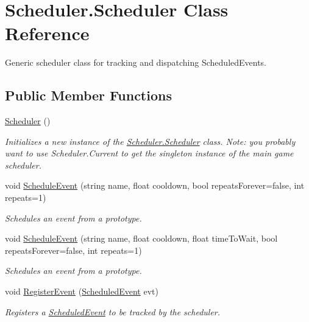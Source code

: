 \hypertarget{class_scheduler_1_1_scheduler}{}\section{Scheduler.\+Scheduler Class Reference}
\label{class_scheduler_1_1_scheduler}


Generic scheduler class for tracking and dispatching Scheduled\+Events.  


\subsection*{Public Member Functions}
\begin{DoxyCompactItemize}
\item 
\hyperlink{class_scheduler_1_1_scheduler_a0e6742111304fdc40c80b819da24d3f7}{Scheduler} ()
\begin{DoxyCompactList}\small\item\em Initializes a new instance of the \hyperlink{class_scheduler_1_1_scheduler}{Scheduler.\+Scheduler} class. Note\+: you probably want to use Scheduler.\+Current to get the singleton instance of the main game scheduler. \end{DoxyCompactList}\item 
void \hyperlink{class_scheduler_1_1_scheduler_a198612b5b2266eab1ac6b80a65f788eb}{Schedule\+Event} (string name, float cooldown, bool repeats\+Forever=false, int repeats=1)
\begin{DoxyCompactList}\small\item\em Schedules an event from a prototype. \end{DoxyCompactList}\item 
void \hyperlink{class_scheduler_1_1_scheduler_aca67becc7742a1ae216cd9e444849f76}{Schedule\+Event} (string name, float cooldown, float time\+To\+Wait, bool repeats\+Forever=false, int repeats=1)
\begin{DoxyCompactList}\small\item\em Schedules an event from a prototype. \end{DoxyCompactList}\item 
void \hyperlink{class_scheduler_1_1_scheduler_a183dd5e7560cd9b70133eea57ef12acd}{Register\+Event} (\hyperlink{class_scheduler_1_1_scheduled_event}{Scheduled\+Event} evt)
\begin{DoxyCompactList}\small\item\em Registers a \hyperlink{class_scheduler_1_1_scheduled_event}{Scheduled\+Event} to be tracked by the scheduler. \end{DoxyCompactList}\item 

\end{DoxyCompactItemize}
